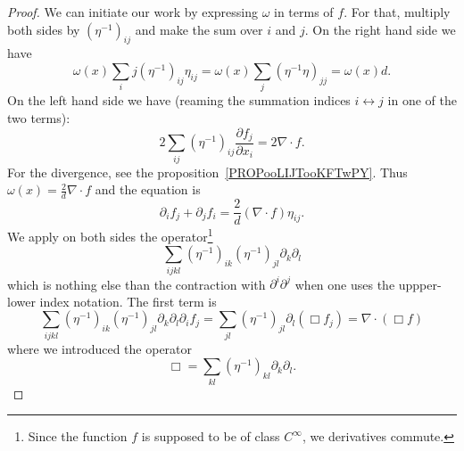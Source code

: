 \begin{proof}
    We can initiate our work by expressing \( \omega\) in terms of \( f\). For that, multiply both sides by \( (\eta^{-1})_{ij}\) and make the sum over \( i\) and \( j\). On the right hand side we have
    \begin{equation}
        \omega(x)\sum_ij(\eta^{-1})_{ij}\eta_{ij}=\omega(x)\sum_j(\eta^{-1}\eta)_{jj}=\omega(x)d.
    \end{equation}
    On the left hand side we have (reaming the summation indices \( i\leftrightarrow j\) in one of the two terms):
    \begin{equation}
        2\sum_{ij}(\eta^{-1})_{ij}\frac{ \partial  f_j }{ \partial x_i }=2\nabla\cdot  f.
    \end{equation}
    For the divergence, see the proposition~\ref{PROPooLIJTooKFTwPY}. Thus \( \omega(x)=\frac{ 2 }{ d }\nabla\cdot f\) and the equation is
    \begin{equation}    \label{EQooAPOPooBdKskD}
        \partial_i f_j+\partial_j f_i=\frac{ 2 }{ d }(\nabla\cdot f)\eta_{ij}.
    \end{equation}
    We apply on both sides the operator\footnote{Since the function \( f\) is supposed to be of class \(  C^{\infty}\), we derivatives commute.}
    \begin{equation}
        \sum_{ijkl}(\eta^{-1})_{ik}(\eta^{-1})_{jl}\partial_k\partial_l
    \end{equation}
    which is nothing else than the contraction with \( \partial^i\partial^j\) when one uses the uppper-lower index notation.
    The first term is
    \begin{equation}
        \sum_{ijkl}(\eta^{-1})_{ik}(\eta^{-1})_{jl}\partial_k\partial_l\partial_i f_j=\sum_{jl}(\eta^{-1})_{jl}\partial_l(\Box  f_j)=\nabla\cdot(\Box f)
    \end{equation}
    where we introduced the operator
    \begin{equation}
        \Box=\sum_{kl}(\eta^{-1})_{kl}\partial_k\partial_l.
    \end{equation}


\end{proof}
